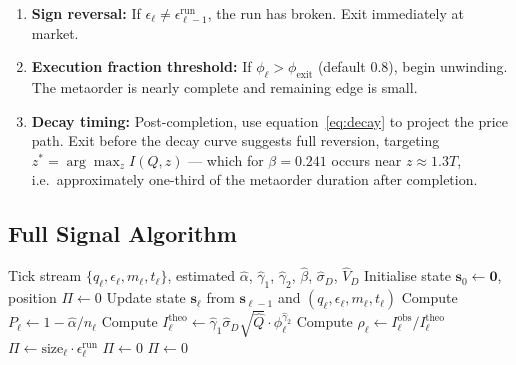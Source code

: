 \documentclass[12pt,a4paper]{article}
\begin{document}
\begin{enumerate}
  \item \textbf{Sign reversal:} If $\epsilon_\ell \neq \epsilon_{\ell-1}^{\text{run}}$,
    the run has broken. Exit immediately at market.

  \item \textbf{Execution fraction threshold:} If $\phi_\ell > \phi_{\text{exit}}$
    (default 0.8), begin unwinding. The metaorder is nearly complete and
    remaining edge is small.

  \item \textbf{Decay timing:} Post-completion, use equation~\eqref{eq:decay}
    to project the price path. Exit before the decay curve suggests
    full reversion, targeting $z^* = \arg\max_z I(Q,z)$ --- which for
    $\beta = 0.241$ occurs near $z \approx 1.3T$, i.e.\ approximately
    one-third of the metaorder duration after completion.
\end{enumerate}

\subsection{Full Signal Algorithm}

\begin{algorithm}[H]
\caption{Metaorder Detection Signal}
\begin{algorithmic}[1]
\Require Tick stream $\{q_\ell, \epsilon_\ell, m_\ell, t_\ell\}$,
         estimated $\hat{\alpha}$, $\hat{\gamma}_1$, $\hat{\gamma}_2$,
         $\hat{\beta}$, $\hat{\sigma}_D$, $\hat{V}_D$
\State Initialise state $\mathbf{s}_0 \leftarrow \mathbf{0}$,
       position $\Pi \leftarrow 0$
  \State Update state $\mathbf{s}_\ell$ from $\mathbf{s}_{\ell-1}$ and
         $(q_\ell, \epsilon_\ell, m_\ell, t_\ell)$
  \State Compute $P_\ell \leftarrow 1 - \hat{\alpha}/n_\ell$
  \State Compute $I_\ell^{\text{theo}} \leftarrow
         \hat{\gamma}_1 \hat{\sigma}_D \sqrt{\hat{Q}} \cdot \phi_\ell^{\hat{\gamma}_2}$
  \State Compute $\rho_\ell \leftarrow I_\ell^{\text{obs}} / I_\ell^{\text{theo}}$
    \State $\Pi \leftarrow \text{size}_\ell \cdot \epsilon_\ell^{\text{run}}$
      \State $\Pi \leftarrow 0$
      \State $\Pi \leftarrow 0$
    \EndIf
  \EndIf
\EndFor
\end{algorithmic}
\end{algorithm}
\end{document}
